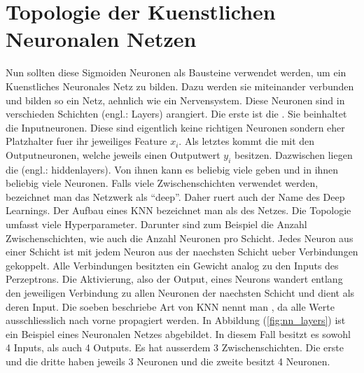 \para{}
\cite{wiki:kuenstliches_neuron}
\cite{wiki:sigmoidfunktion}


\section{Topologie der Kuenstlichen Neuronalen Netzen}
Nun sollten diese Sigmoiden Neuronen als Bausteine verwendet werden, um ein Kuenstliches
Neuronales Netz zu bilden. Dazu werden sie miteinander verbunden und bilden so ein Netz,
aehnlich wie ein Nervensystem.
\para{}
Diese Neuronen sind in verschieden Schichten (engl.: Layers)
arangiert. Die erste ist die . Sie beinhaltet die
Inputneuronen. Diese sind eigentlich keine richtigen
Neuronen sondern eher Platzhalter fuer ihr jeweiliges Feature $x_i$. Als letztes kommt die
 mit den Outputneuronen, welche jeweils einen Outputwert $y_i$
besitzen. Dazwischen liegen die  (engl.: hiddenlayers). Von ihnen kann es
beliebig viele geben und in ihnen beliebig viele Neuronen.
Falls viele Zwischenschichten verwendet werden, bezeichnet man das Netzwerk als
``deep''. Daher ruert auch der Name des Deep Learnings.
Der Aufbau eines KNN bezeichnet man als  des Netzes. Die
Topologie umfasst viele Hyperparameter. Darunter sind zum Beispiel die Anzahl Zwischenschichten, wie auch
die Anzahl Neuronen pro Schicht.
\para{}
Jedes Neuron aus einer Schicht ist mit jedem Neuron aus der naechsten Schicht ueber
Verbindungen gekoppelt. Alle Verbindungen besitzten ein Gewicht analog zu den Inputs des
Perzeptrons. Die Aktivierung, also der Output, eines Neurons wandert entlang den jeweiligen
Verbindung zu allen Neuronen der naechsten Schicht und dient als deren Input.
Die soeben beschriebe Art von KNN nennt man , da alle Werte
ausschliesslich nach vorne propagiert werden.
\para{}
In Abbildung (\ref{fig:nn_layers}) ist ein Beispiel eines Neuronalen Netzes
abgebildet. In diesem Fall besitzt es sowohl 4 Inputs, als auch 4 Outputs. Es hat
ausserdem 3 Zwischenschichten. Die erste und die dritte haben jeweils 3 Neuronen
und die zweite besitzt 4 Neuronen. \\

